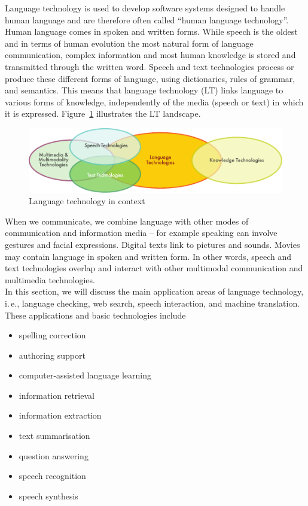 \documentclass[]{../../metanetpaper}
\begin{document}
\begin{multicols}{2}
Language technology is used to develop software systems designed to handle human language and are therefore often called “human language technology”. Human language comes in spoken and written forms. While speech is the oldest and in terms of human evolution the most natural form of language communication, complex information and most human knowledge is stored and transmitted through the written word. Speech and text technologies process or produce these different forms of language, using dictionaries, rules of grammar, and semantics. This means that language technology (LT) links language to various forms of knowledge, independently of the media (speech or text) in which it is expressed. Figure~\ref{fig:ltincontext_en} illustrates the LT landscape.

\begin{figure}[htb]
  \center
  \includegraphics[width=\textwidth]{../_media/english/language_technologies}
  \caption{Language technology in context}
  \label{fig:ltincontext_en}
\end{figure}

When we communicate, we combine language with other modes of communication and information media – for example speaking can involve gestures and facial expressions. Digital texts link to pictures and sounds. Movies may contain language in spoken and written form. In other words, speech and text technologies overlap and interact with other multimodal communication and multimedia technologies.\\ 
In this section, we will discuss the main application areas of language technology, i.\,e., language checking, web search, speech interaction, and machine translation. These applications and basic technologies include 

\begin{itemize}
\item spelling correction
\item authoring support
\item computer-assisted language learning
\item information retrieval 
\item information extraction
\item text summarisation
\item question answering
\item speech recognition 
\item speech synthesis 
\end{itemize}


\end{multicols}
\end{document}
